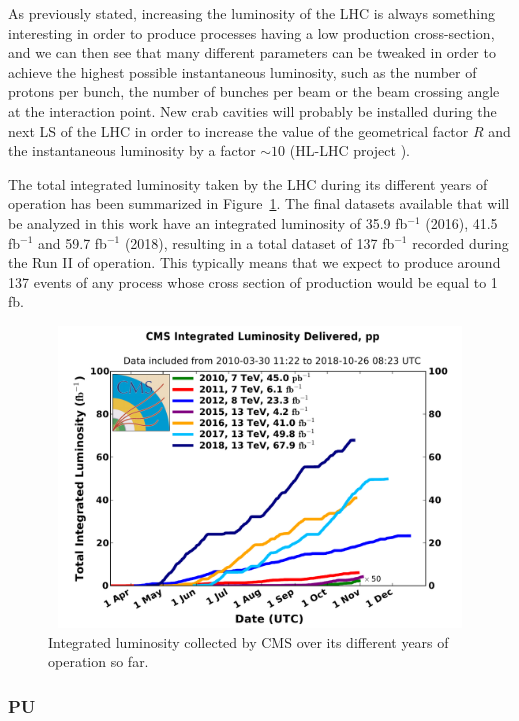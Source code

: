 \documentclass[a4paper, 10pt, openright]{report}
\begin{document}
As previously stated, increasing the luminosity of the \ac{LHC} is always something interesting in order to produce processes having a low production cross-section, and we can then see that many different parameters can be tweaked in order to achieve the highest possible instantaneous luminosity, such as the number of protons per bunch, the number of bunches per beam or the beam crossing angle at the interaction point. New crab cavities will probably be installed during the next \ac{LS} of the \ac{LHC} in order to increase the value of the geometrical factor $R$ and the instantaneous luminosity by a factor $\sim 10$ (HL-LHC project \cite{HLLHC}).

The total integrated luminosity taken by the \ac{LHC} during its different years of operation has been summarized in Figure~\ref{fig:Lumi}. The final datasets available that will be analyzed in this work have an integrated luminosity of 35.9 fb$^{-1}$ (2016), 41.5 fb$^{-1}$ and 59.7 fb$^{-1}$ (2018), resulting in a total dataset of 137 fb$^{-1}$ recorded during the Run II of operation. This typically means that we expect to produce around 137 events of any process whose cross section of production would be equal to 1 fb.

\begin{figure}[htbp]
\begin{center}
\includegraphics[width=12cm, height=8cm]{figs/CumuLumi.pdf}
\caption{Integrated luminosity collected by \ac{CMS} over its different years of operation so far.}
\label{fig:Lumi}
\end{center}
\end{figure}

\subsubsection{\acf{PU}} \label{subsection:PU}
\end{document}
